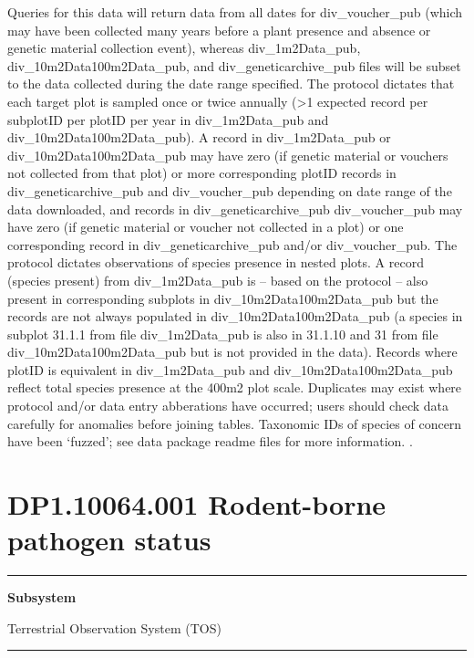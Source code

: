 \documentclass[]{article}
\begin{document}
Queries for this data will return data from all dates for
div\_voucher\_pub (which may have been collected many years before a
plant presence and absence or genetic material collection event),
whereas div\_1m2Data\_pub, div\_10m2Data100m2Data\_pub, and
div\_geneticarchive\_pub files will be subset to the data collected
during the date range specified. The protocol dictates that each target
plot is sampled once or twice annually (\textgreater{}1 expected record
per subplotID per plotID per year in div\_1m2Data\_pub and
div\_10m2Data100m2Data\_pub). A record in div\_1m2Data\_pub or
div\_10m2Data100m2Data\_pub may have zero (if genetic material or
vouchers not collected from that plot) or more corresponding plotID
records in div\_geneticarchive\_pub and div\_voucher\_pub depending on
date range of the data downloaded, and records in
div\_geneticarchive\_pub div\_voucher\_pub may have zero (if genetic
material or voucher not collected in a plot) or one corresponding record
in div\_geneticarchive\_pub and/or div\_voucher\_pub. The protocol
dictates observations of species presence in nested plots. A record
(species present) from div\_1m2Data\_pub is -- based on the protocol --
also present in corresponding subplots in div\_10m2Data100m2Data\_pub
but the records are not always populated in div\_10m2Data100m2Data\_pub
(a species in subplot 31.1.1 from file div\_1m2Data\_pub is also in
31.1.10 and 31 from file div\_10m2Data100m2Data\_pub but is not provided
in the data). Records where plotID is equivalent in div\_1m2Data\_pub
and div\_10m2Data100m2Data\_pub reflect total species presence at the
400m2 plot scale. Duplicates may exist where protocol and/or data entry
abberations have occurred; users should check data carefully for
anomalies before joining tables. Taxonomic IDs of species of concern
have been `fuzzed'; see data package readme files for more information.
\newpage
.

\section{DP1.10064.001 Rodent-borne pathogen
status}\label{dp1.10064.001-rodent-borne-pathogen-status}

\begin{center}\rule{0.5\linewidth}{\linethickness}\end{center}

\textbf{Subsystem}

Terrestrial Observation System (TOS)

\begin{center}\rule{0.5\linewidth}{\linethickness}\end{center}
\end{document}

